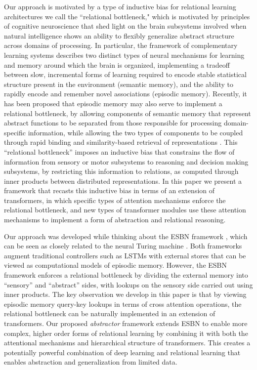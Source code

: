 Our approach is motivated by a type of inductive bias for relational learning architectures we call the
``relational bottleneck," which is motivated by principles of cognitive neuroscience that shed light on the brain
subsystems involved when natural intelligence shows an ability to flexibly generalize abstract structure across
domains of processing. In particular, the framework of complementary learning systems \citep{McClelland:1995,
    Kumaran:2016} describes two distinct types of neural mechanisms for learning and memory around which the brain
is organized, implementing a tradeoff between slow, incremental forms of learning required to encode stable statistical
structure present in the environment (semantic memory), and the ability to rapidly encode and remember novel
associations
(episodic memory).
Recently, it has been proposed that episodic memory may also serve to implement a relational bottleneck,
by allowing components of semantic memory that represent abstract functions to be separated from those
responsible for processing domain-specific information, while allowing the two types of components to be coupled
through rapid binding and similarity-based retrieval of representations \citep{esbn}.
This
``relational bottleneck'' imposes an inductive bias that constrains the flow of information from sensory or motor subsystems to reasoning and
decision making subsystems, by restricting this information to relations, as computed through inner products
between distributed representations. In this paper we present a framework that
recasts
this inductive bias in terms of an extension of transformers, in which specific types of attention mechanisms enforce
the relational bottleneck, and new types of transformer modules use these attention mechanisms to implement a form of
abstraction and relational reasoning.

Our approach was developed while thinking about the ESBN framework \citep{esbn}, which can be seen as 
closely related to the neural Turing machine \citep{NTM}. Both frameworks augment traditional controllers such as 
LSTMs with external stores that can be viewed as computational models of episodic memory. However, the ESBN
framework enforces a relational bottleneck by dividing the external memory into ``sensory'' and ``abstract'' sides,
with lookups on the sensory side carried out using inner products. The key observation we develop in this paper is
that by viewing episodic memory query-key lookups in terms of cross attention operations, the relational bottleneck can be
naturally implemented in an extension of transformers. Our proposed \textit{abstractor} framework extends ESBN to
enable more complex, higher order forms of relational learning by combining it with both the attentional mechanisms
and hierarchical structure of transformers. This creates a potentially powerful combination of deep learning and
relational learning that enables abstraction and generalization from limited data.
